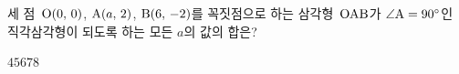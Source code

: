 세 점~$\mathrm{O}(0,\mkern3mu 0)$, $\mathrm{A}(a,\mkern3mu 2)$, $\mathrm{B}(6,\mkern3mu -2)$를 꼭짓점으로 하는 삼각형~$\mathrm{OAB}$가 $\angle\mathrm{A}=90^\circ$인 직각삼각형이 되도록 하는 모든 $a$의 값의 합은?
\begin{choices32}{$4$}{$5$}{$6$}{$7$}{$8$}\end{choices32}
